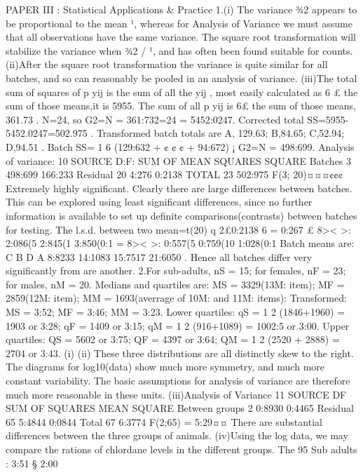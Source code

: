 PAPER III : Statistical Applications & Practice
1.(i)
The variance ¾2 appears to be proportional to the mean ¹, whereas for Analysis of Variance
we must assume that all observations have the same variance. The square root transformation will
stabilize the variance when ¾2 / ¹, and has often been found suitable for counts.
(ii)After the square root transformation the variance is quite similar for all batches, and so can
reasonably be pooled in an analysis of variance.
(iii)The total sum of squares of p
yij is the sum of all the yij , most easily calculated as 6 £ the
sum of those means,it is 5955.
The sum of all p
yij is 6£ the sum of those means, 361.73 .
N=24, so G2=N = 361:732=24 = 5452:0247.
Corrected total SS=5955-5452.0247=502.975 .
Transformed batch totals are A, 129.63; B,84.65; C,52.94; D,94.51 .
Batch SS= 1
6 (129:632 + ¢ ¢ ¢ + 94:672) ¡ G2=N = 498:699.
Analysis of variance:
10
SOURCE D:F: SUM OF MEAN
SQUARES SQUARE
Batches 3 498:699 166:233
Residual 20 4:276 0:2138
TOTAL 23 502:975
F(3; 20)¤¤¤¢¢¢ Extremely highly significant.
Clearly there are large differences between batches. This can be explored using least significant
differences, since no further information is available to set up definite comparisons(contrasts) between
batches for testing.
The l.s.d. between two mean=t(20)
q
2£0:2138
6 = 0:267 £
8><
>:
2:086(5%
2:845(1%
3:850(0:1%
=
8><
>:
0:557(5%
0:759(10%
1:028(0:1%
Batch means are: C B D A
8:8233 14:1083 15:7517 21:6050
.
Hence all batches differ very significantly from are another.
2.For sub-adults, nS = 15; for females, nF = 23; for males, nM = 20. Medians and quartiles are:
MS = 3329(13M:
item); MF = 2859(12M:
item); MM = 1693(averrage of 10M:
and 11M:
items):
Transformed: MS = 3:52; MF = 3:46; MM = 3:23.
Lower quartiles: qS = 1
2 (1846+1960) = 1903 or 3:28; qF = 1409 or 3:15; qM = 1
2 (916+1089) =
1002:5 or 3:00.
Upper quartiles: QS = 5602 or 3:75; QF = 4397 or 3:64; QM = 1
2 (2520 + 2888) = 2704 or 3:43.
(i) (ii)
These three distributions are all distinctly skew to the right.
The diagrams for log10(data) show much more symmetry, and much more constant variability.
The basic assumptions for analysis of variance are therefore much more reasonable in these units.
(iii)Analysis of Variance
11
SOURCE DF SUM OF SQUARES MEAN SQUARE
Between groups 2 0:8930 0:4465
Residual 65 5:4844 0:0844
Total 67 6:3774
F(2;65) = 5:29¤¤
There are substantial differences between the three groups of animals.
(iv)Using the log data, we may compare the rations of chlordane levels in the different groups.
The 95%
Sub adults : 3:51 § 2:00
